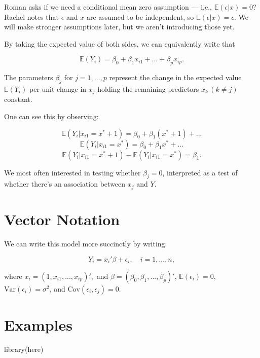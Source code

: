 \documentclass[
  letterpaper,
  DIV=11,
  numbers=noendperiod]{scrreport}
\newenvironment{Shaded}{\begin{snugshade}}{\end{snugshade}}
\newcommand{\FunctionTok}[1]{\textcolor[rgb]{0.28,0.35,0.67}{#1}}
\newcommand{\NormalTok}[1]{\textcolor[rgb]{0.00,0.23,0.31}{#1}}
\begin{document}
Roman asks if we need a conditional mean zero assumption --- i.e.,
\(\mathbb E(\epsilon | x) = 0\)? Rachel notes that \(\epsilon\) and
\(x\) are assumed to be independent, so
\(\mathbb E(\epsilon | x) = \epsilon\). We will make stronger
assumptions later, but we aren't introducing those yet.

By taking the expected value of both sides, we can equivalently write
that

\[\mathbb E(Y_i) = \beta_0 + \beta_1 x_{i1} + ... + \beta_p x_{ip}.\]

The parameters \(\beta_j\) for \(j = 1, ..., p\) represent the change in
the expected value \(\mathbb E(Y_i)\) per unit change in \(x_j\) holding
the remaining predictors \(x_k \, (k \neq j)\) constant.

One can see this by observing:

\[ \mathbb E(Y_i | x_{i1} = x^* + 1) = \beta_0 + \beta_1 (x^* + 1) + ...\]
\[ \mathbb E(Y_i | x_{i1} = x^*) = \beta_0 + \beta_1 x^* + ...\]
\[ \mathbb E(Y_i | x_{i1} = x^* + 1) - \mathbb E(Y_i | x_{i1} = x^*) = \beta_1.\]

We most often interested in testing whether \(\beta_j = 0\), interpreted
as a test of whether there's an association between \(x_j\) and \(Y\).

\hypertarget{vector-notation}{%
\section{Vector Notation}\label{vector-notation}}

We can write this model more succinctly by writing:

\[ Y_i = x_i' \beta + \epsilon_i, \quad i = 1, ..., n,\]

where \(x_i = (1, x_{i1}, ..., x_{ip})',\) and
\(\beta = (\beta_0, \beta_1, ..., \beta_p)'\),
\(\mathbb E(\epsilon_i) = 0\), \(\text{Var}(\epsilon_i) = \sigma^2\),
and \(\text{Cov}(\epsilon_i, \epsilon_j) = 0\).

\hypertarget{examples}{%
\section{Examples}\label{examples}}

\begin{Shaded}
\begin{Highlighting}[]
\FunctionTok{library}\NormalTok{(here)}
\end{Highlighting}
\end{Shaded}
\end{document}
